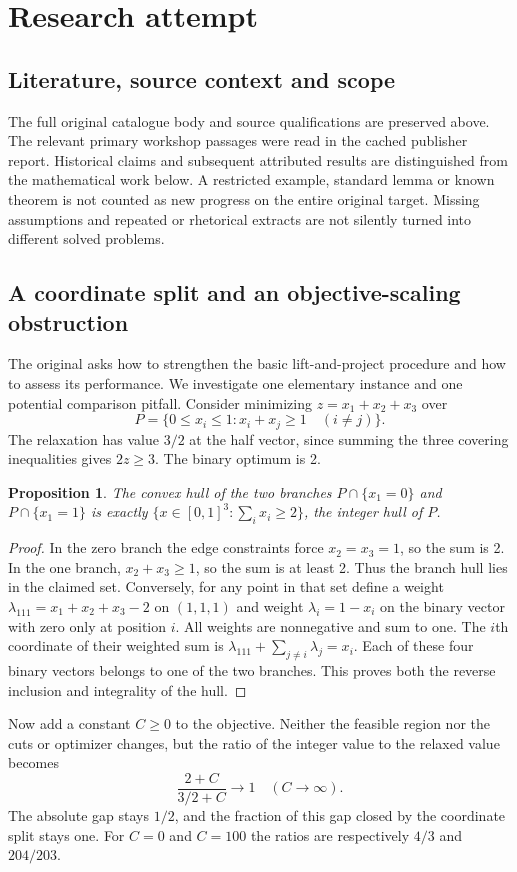 \documentclass[11pt]{article}
\newtheorem{proposition}{Proposition}
\begin{document}
\section{Research attempt}
\subsection{Literature, source context and scope}
The full original catalogue body and source qualifications are preserved above. The relevant primary workshop passages were read in the cached publisher report. Historical claims and subsequent attributed results are distinguished from the mathematical work below. A restricted example, standard lemma or known theorem is not counted as new progress on the entire original target. Missing assumptions and repeated or rhetorical extracts are not silently turned into different solved problems.

\subsection{A coordinate split and an objective-scaling obstruction}
The original asks how to strengthen the basic lift-and-project procedure and how to assess its performance. We investigate one elementary instance and one potential comparison pitfall. Consider minimizing $z=x_1+x_2+x_3$ over
\[
P=\{0\le x_i\le1:x_i+x_j\ge1\quad(i\ne j)\}.
\]
The relaxation has value $3/2$ at the half vector, since summing the three covering inequalities gives $2z\ge3$. The binary optimum is 2.
\begin{proposition}
The convex hull of the two branches $P\cap\{x_1=0\}$ and $P\cap\{x_1=1\}$ is exactly $\{x\in[0,1]^3:\sum_i x_i\ge2\}$, the integer hull of $P$.
\end{proposition}
\begin{proof}
In the zero branch the edge constraints force $x_2=x_3=1$, so the sum is 2. In the one branch, $x_2+x_3\ge1$, so the sum is at least 2. Thus the branch hull lies in the claimed set. Conversely, for any point in that set define a weight $\lambda_{111}=x_1+x_2+x_3-2$ on $(1,1,1)$ and weight $\lambda_i=1-x_i$ on the binary vector with zero only at position $i$. All weights are nonnegative and sum to one. The $i$th coordinate of their weighted sum is $\lambda_{111}+\sum_{j\ne i}\lambda_j=x_i$. Each of these four binary vectors belongs to one of the two branches. This proves both the reverse inclusion and integrality of the hull.
\end{proof}
Now add a constant $C\ge0$ to the objective. Neither the feasible region nor the cuts or optimizer changes, but the ratio of the integer value to the relaxed value becomes
\[
\frac{2+C}{3/2+C}\longrightarrow1\quad(C\to\infty).
\]
The absolute gap stays $1/2$, and the fraction of this gap closed by the coordinate split stays one. For $C=0$ and $C=100$ the ratios are respectively $4/3$ and $204/203$.
\end{document}
